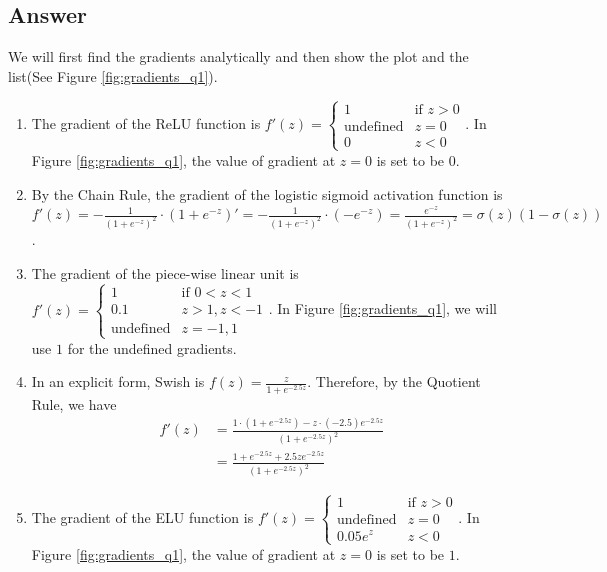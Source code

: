 \documentclass[
	12pt, %
]{../Template/fphw}
\begin{document}

\subsection*{Answer}
We will first find the gradients analytically and then show the plot and the list(See Figure \ref{fig:gradients_q1}).

\begin{enumerate}[label = (\arabic*)]
\item The gradient of the ReLU function is \( f'(z) = \begin{cases} 1 & \text{if } z > 0 \\ \text{undefined} & z=0\\ 0 & z<0 \end{cases}\). In Figure \ref{fig:gradients_q1}, the value of gradient at $z=0$ is set to be $0$.  
\item By the Chain Rule, the gradient of the logistic sigmoid activation function is $f'(z) = -\frac{1}{(1+e^{-z})^2}\cdot (1+e^{-z})' = -\frac{1}{(1+e^{-z})^2} \cdot (-e^{-z}) = \frac{e^{-z}}{(1+e^{-z})^2} = \sigma(z)(1-\sigma(z))$.
\item The gradient of the piece-wise linear unit is \( f'(z) = \begin{cases} 1 & \text{if } 0<z<1 \\ 0.1 & z>1, z<-1 \\ \text{undefined} & z=-1,1 \end{cases}\). In Figure \ref{fig:gradients_q1}, we will use $1$ for the undefined gradients.
\item In an explicit form, Swish is $f(z) =\frac{z}{1+e^{-2.5z}}$. Therefore, by the Quotient Rule, we have 
\begin{align*}f'(z) &= \frac{1\cdot (1+e^{-2.5z})-z\cdot (-2.5)e^{-2.5z}}{(1+e^{-2.5z})^2} \\ &= \frac{1+e^{-2.5z}+2.5ze^{-2.5z}}{(1+e^{-2.5z})^2}\end{align*}
\item The gradient of the ELU function is \( f'(z) = \begin{cases} 1 & \text{if } z > 0 \\ \text{undefined} & z=0\\ 0.05e^z & z<0 \end{cases}\). In Figure \ref{fig:gradients_q1}, the value of gradient at $z=0$ is set to be $1$. 

\end{enumerate}
\end{document}
